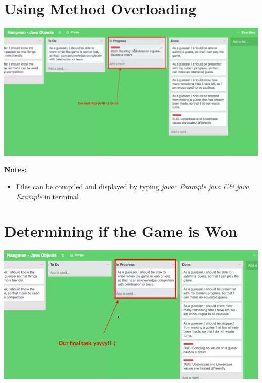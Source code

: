 \documentclass[12pt]{article}
\begin{document}
\bigskip

\section{Using Method Overloading}

\bigskip

\begin{center}
\includegraphics[width=\linewidth]{images/part_4_notes_3.png}
\end{center}

\bigskip

\underline{\textbf{Notes:}}

\bigskip

\begin{itemize}
    \item Files can be compiled and displayed by typing \textit{javac Example.java \&\& java Example}
    in terminal
\end{itemize}

\bigskip

\section{Determining if the Game is Won}

\bigskip

\begin{center}
\includegraphics[width=\linewidth]{images/part_4_notes_5.png}
\end{center}
\end{document}
